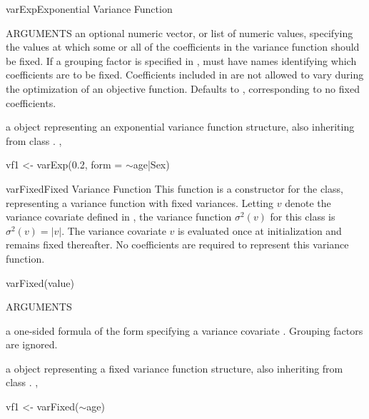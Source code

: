 \documentclass[pdftex]{article} \usepackage{url,graphicx}
\renewcommand{\Twiddle}{\mbox{\(\sim\)}}
\begin{document}
\begin{Helpfile}{varExp}{Exponential Variance Function}
\begin{Argument}{ARGUMENTS}
an optional numeric vector, or list of numeric values,
specifying the values at which some or all of the  coefficients in
the variance function should be fixed. If a grouping factor is
specified in ,  must have names identifying
which coefficients are to be fixed. Coefficients included in
 are not allowed to vary during the optimization of an
objective function. Defaults to , corresponding to no
fixed coefficients.
\end{Argument}
a  object representing an exponential variance function
structure, also inheriting from class .
, 
\need 15pt
\vspace{-16pt} 
\begin{Example}
vf1 <- varExp(0.2, form = \Twiddle age|Sex)
\end{Example}
\end{Helpfile}
\begin{Helpfile}{varFixed}{Fixed Variance Function}
This function is a constructor for the  class,
representing a variance function with fixed variances. Letting $v$
denote the variance covariate defined in , the variance
function $\sigma^2(v)$ for this class is
$\sigma^2(v)=|v|$. The variance covariate $v$ is
evaluated once at initialization and remains fixed thereafter. No
coefficients are required to represent this variance function.
\begin{Example}
varFixed(value)
\end{Example}
\begin{Argument}{ARGUMENTS}
\item[\Co{value:}]
a one-sided formula of the form \Co{\Twiddle v} specifying a
variance covariate . Grouping factors are ignored.
\end{Argument}
a  object representing a fixed variance function
structure, also inheriting from class .
, 
\need 15pt
\vspace{-16pt} 
\begin{Example}
vf1 <- varFixed(\Twiddle age)
\end{Example}
\end{Helpfile}
\end{document}
